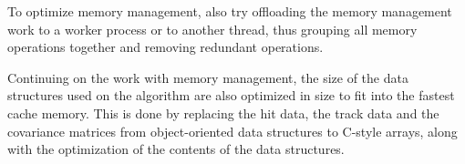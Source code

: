 To optimize memory management, \cite{cerati2016kalman} also try offloading the memory management work to a worker process or to another thread, thus grouping all memory operations together and removing redundant operations.

Continuing on the work with memory management, the size of the data structures used on the algorithm are also optimized in size to fit into the fastest cache memory.
This is done by replacing the hit data, the track data and the covariance matrices from object-oriented data structures to C-style arrays, along with the optimization of the contents of the data structures.